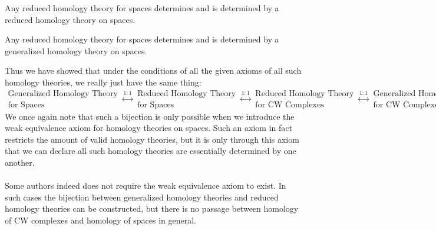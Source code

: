 \documentclass[a4paper]{article}
\begin{document}
\begin{thm}{}{} Any reduced homology theory for spaces determines and is determined by a reduced homology theory on spaces. 
\end{thm}

\begin{thm}{}{} Any reduced homology theory for spaces determines and is determined by a generalized homology theory on spaces. 
\end{thm}

Thus we have showed that under the conditions of all the given axioms of all such homology theories, we really just have the same thing: $$\substack{\text{Generalized  Homology Theory}\\\text{for Spaces}}\overset{1:1}{\longleftrightarrow}\substack{\text{Reduced Homology Theory}\\\text{for Spaces}}\overset{1:1}{\longleftrightarrow}\substack{\text{Reduced Homology Theory}\\\text{for CW Complexes}}\overset{1:1}{\longleftrightarrow}\substack{\text{Generalized Homology Theory}\\\text{for CW Complexes}}$$ We once again note that such a bijection is only possible when we introduce the weak equivalence axiom for homology theories on spaces. Such an axiom in fact restricts the amount of valid homology theories, but it is only through this axiom that we can declare all such homology theories are essentially determined by one another. \\~\\

Some authors indeed does not require the weak equivalence axiom to exist. In such cases the bijection between generalized homology theories and reduced homology theories can be constructed, but there is no passage between homology of CW complexes and homology of spaces in general. 
\end{document}
